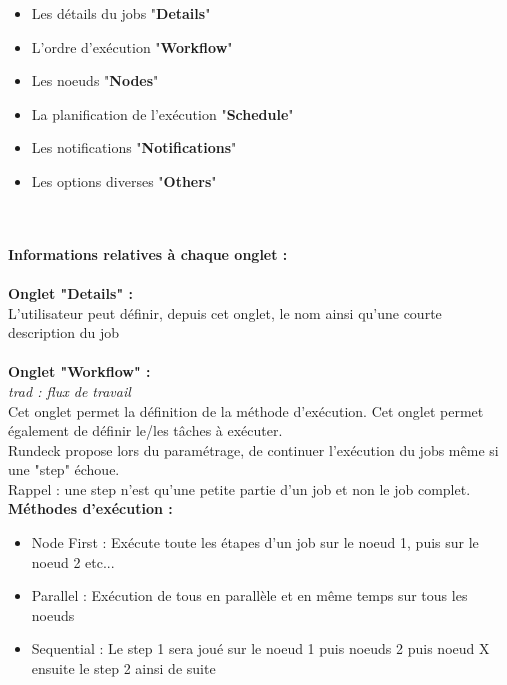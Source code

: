\documentclass[12pt]{article}
\begin{document}
\begin{itemize}
    \item Les détails du jobs "\textbf{Details}"
    \item L'ordre d'exécution "\textbf{Workflow}"
    \item Les noeuds "\textbf{Nodes}"
    \item La planification de l'exécution "\textbf{Schedule}"
    \item Les notifications "\textbf{Notifications}"
    \item Les options diverses "\textbf{Others}"
\end{itemize}
\\
\vspace{0.5cm}
\\
\textbf{Informations relatives à chaque onglet :}
\\
\vspace{0.5cm}
\\
\textbf{Onglet "Details" :}
\\
L'utilisateur peut définir, depuis cet onglet, le nom ainsi qu'une courte description du job
\\
\vspace{0.2cm}
\\
\textbf{Onglet "Workflow" :}
\\
\textit{trad : flux de travail}
\\
Cet onglet permet la définition de la méthode d'exécution. Cet onglet permet également de définir le/les tâches à exécuter.
\\
Rundeck propose lors du paramétrage, de continuer l'exécution du jobs même si une "step" échoue. 
\\
Rappel : une step n'est qu'une petite partie d'un job et non le job complet.
\vspace{0.5cm}
\\
\textbf{Méthodes d'exécution :}
\begin{itemize}
    \item Node First : Exécute toute les étapes d'un job sur le noeud 1, puis sur le noeud 2 etc...
    \item Parallel : Exécution de tous en parallèle et en même temps sur tous les noeuds
    \item Sequential : Le step 1 sera joué sur le noeud 1 puis noeuds 2 puis noeud X ensuite le step 2 ainsi de suite
\end{itemize}
\\
\vspace{0.2cm}
\\
\end{document}
